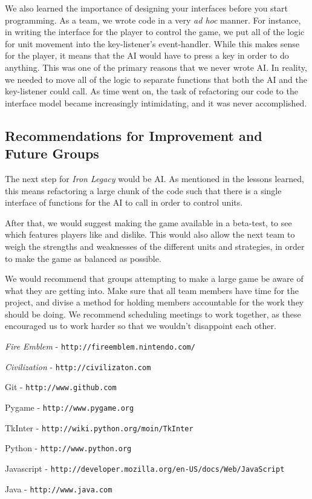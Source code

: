 \documentclass{article}
\begin{document}
We also learned the importance of designing your interfaces before you start
    programming.
    As a team, we wrote code in a very \emph{ad hoc} manner.
    For instance, in writing the interface for the player to control the game,
    we put all of the logic for unit movement into the key-listener's
    event-handler.
    While this makes sense for the player, it means that the AI would have
    to press a key in order to do anything.
    This was one of the primary reasons that we never wrote AI.
    In reality, we needed to move all of the logic to separate functions that
    both the AI and the key-listener could call.
    As time went on, the task of refactoring our code to the interface model
    became increasingly intimidating, and it was never accomplished.

\subsection*{Recommendations for Improvement and Future Groups}

The next step for \emph{Iron Legacy} would be AI.
    As mentioned in the lessons learned, this means refactoring a large
    chunk of the code such that there is a single interface
    of functions for the AI to call in order to control units.

After that, we would suggest making the game available in a beta-test,
    to see which features players like and dislike.
    This would also allow the next team to weigh the strengths and weaknesses
    of the different units and strategies, in order to make the game as
    balanced as possible.

We would recommend that groups attempting to make a large game be aware
    of what they are getting into.
    Make sure that all team members have time for the project,
    and divise a method for holding members accountable for the work
    they should be doing.
    We recommend scheduling meetings to work together,
    as these encouraged us to work harder so that we wouldn't disappoint
    each other.

\begin{thebibliography}{99}

\emph{Fire Emblem} - {\tt http://fireemblem.nintendo.com/}

\emph{Civilization} - {\tt http://civilizaton.com}

Git - {\tt http://www.github.com}

Pygame - {\tt http://www.pygame.org}

TkInter - {\tt http://wiki.python.org/moin/TkInter}

Python - {\tt http://www.python.org}

Javascript - {\tt http://developer.mozilla.org/en-US/docs/Web/JavaScript}

Java - {\tt http://www.java.com}
\end{thebibliography}
\end{document}

